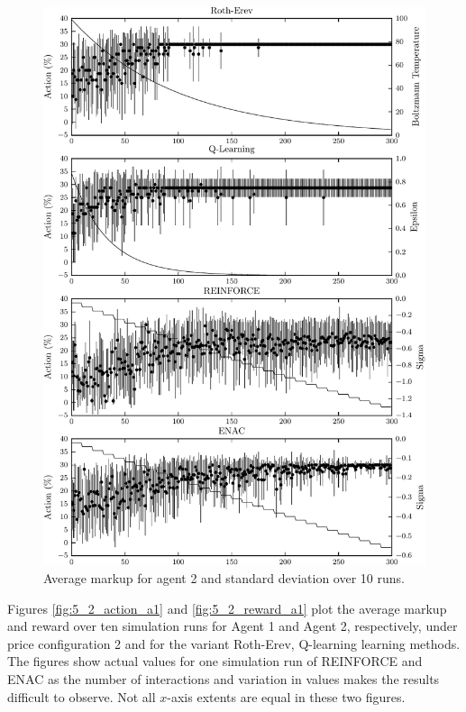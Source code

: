 {	\begin{figure}
	  \centering
	  \includegraphics{figures/fig5_1_action_a2}
	  \caption{Average markup for agent 2 and standard deviation over 10 runs.}
	  \label{fig:5_1_action_a2}
	\end{figure}
}{}

Figures \ref{fig:5_2_action_a1} and \ref{fig:5_2_reward_a1} plot the average
markup and reward over ten simulation runs for Agent 1 and Agent 2,
respectively, under price configuration 2 and for the variant Roth-Erev,
Q-learning learning methods.  The figures show actual values for one simulation
run of REINFORCE and ENAC as the number of interactions and variation in values
makes the results difficult to observe.  Not all $x$-axis extents are equal in
these two figures.

